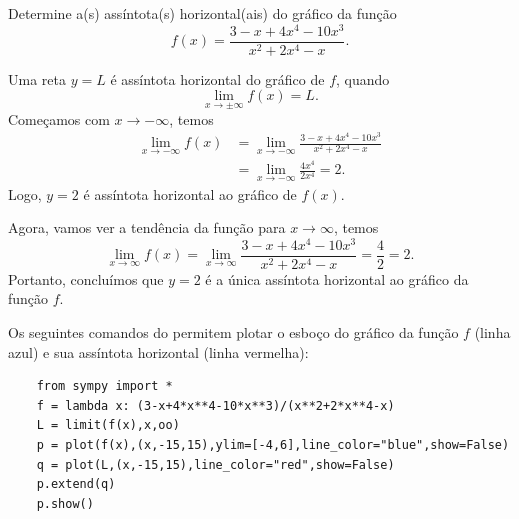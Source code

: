 \begin{exeresol}
  Determine a(s) assíntota(s) horizontal(ais) do gráfico da função
  \begin{equation}
    f(x) = \frac{3 - x + 4x^4 - 10x^3}{x^2 + 2x^4 -x}.
  \end{equation}
\end{exeresol}
\begin{resol}
  Uma reta $y = L$ é assíntota horizontal do gráfico de $f$, quando
  \begin{equation}
    \lim_{x\to\pm\infty} f(x) = L.
  \end{equation}
  Começamos com $x\to-\infty$, temos
  \begin{align}
    \lim_{x\to-\infty} f(x) &= \lim_{x\to-\infty} \frac{3 - x + 4x^4 - 10x^3}{x^2 + 2x^4 -x} \\
                            &= \lim_{x\to -\infty} \frac{4x^4}{2x^4} = 2.
  \end{align}
  Logo, $y=2$ é assíntota horizontal ao gráfico de $f(x)$.

  Agora, vamos ver a tendência da função para $x\to\infty$, temos
  \begin{equation}
    \lim_{x\to\infty} f(x) = \lim_{x\to\infty} \frac{3 - x + 4x^4 - 10x^3}{x^2 + 2x^4 -x} = \frac{4}{2} = 2.
  \end{equation}
  Portanto, concluímos que $y=2$ é a única assíntota horizontal ao gráfico da função $f$.

  \ifispython
  Os seguintes comandos do {\sympy} permitem plotar o esboço do gráfico da função $f$ (linha azul) e sua assíntota horizontal (linha vermelha):
  \begin{lstlisting}
    from sympy import *
    f = lambda x: (3-x+4*x**4-10*x**3)/(x**2+2*x**4-x)
    L = limit(f(x),x,oo)
    p = plot(f(x),(x,-15,15),ylim=[-4,6],line_color="blue",show=False)
    q = plot(L,(x,-15,15),line_color="red",show=False)
    p.extend(q)
    p.show()
  \end{lstlisting}
  \fi
\end{resol}

